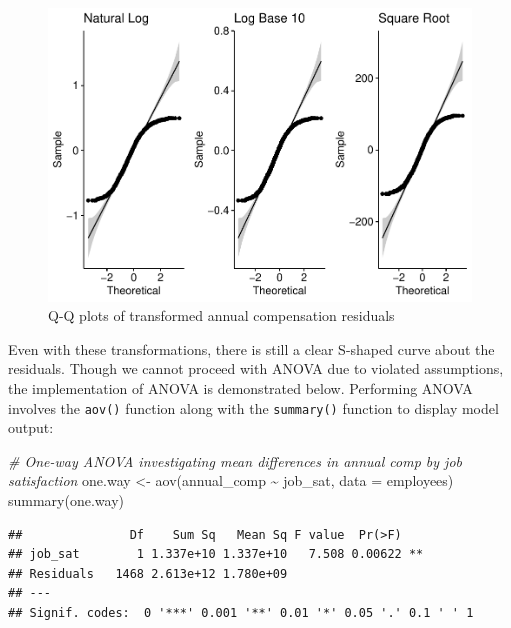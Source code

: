\documentclass[
]{book}
\newenvironment{Shaded}{\begin{snugshade}}{\end{snugshade}}
\newcommand{\AttributeTok}[1]{\textcolor[rgb]{0.77,0.63,0.00}{#1}}
\newcommand{\CommentTok}[1]{\textcolor[rgb]{0.56,0.35,0.01}{\textit{#1}}}
\newcommand{\FunctionTok}[1]{\textcolor[rgb]{0.00,0.00,0.00}{#1}}
\newcommand{\NormalTok}[1]{#1}
\newcommand{\OtherTok}[1]{\textcolor[rgb]{0.56,0.35,0.01}{#1}}
\newcommand{\SpecialCharTok}[1]{\textcolor[rgb]{0.00,0.00,0.00}{#1}}
\begin{document}
\begin{figure}

{\centering \includegraphics{The_Fundamentals_of_People_Analytics_files/figure-latex/qq-plots-trans-1} 

}

\caption{Q-Q plots of transformed annual compensation residuals}\label{fig:qq-plots-trans}
\end{figure}

Even with these transformations, there is still a clear S-shaped curve about the residuals. Though we cannot proceed with ANOVA due to violated assumptions, the implementation of ANOVA is demonstrated below. Performing ANOVA involves the \texttt{aov()} function along with the \texttt{summary()} function to display model output:

\begin{Shaded}
\begin{Highlighting}[]
\CommentTok{\# One{-}way ANOVA investigating mean differences in annual comp by job satisfaction}
\NormalTok{one.way }\OtherTok{\textless{}{-}} \FunctionTok{aov}\NormalTok{(annual\_comp }\SpecialCharTok{\textasciitilde{}}\NormalTok{ job\_sat, }\AttributeTok{data =}\NormalTok{ employees)}
\FunctionTok{summary}\NormalTok{(one.way)}
\end{Highlighting}
\end{Shaded}

\begin{verbatim}
##               Df    Sum Sq   Mean Sq F value  Pr(>F)   
## job_sat        1 1.337e+10 1.337e+10   7.508 0.00622 **
## Residuals   1468 2.613e+12 1.780e+09                   
## ---
## Signif. codes:  0 '***' 0.001 '**' 0.01 '*' 0.05 '.' 0.1 ' ' 1
\end{verbatim}
\end{document}
